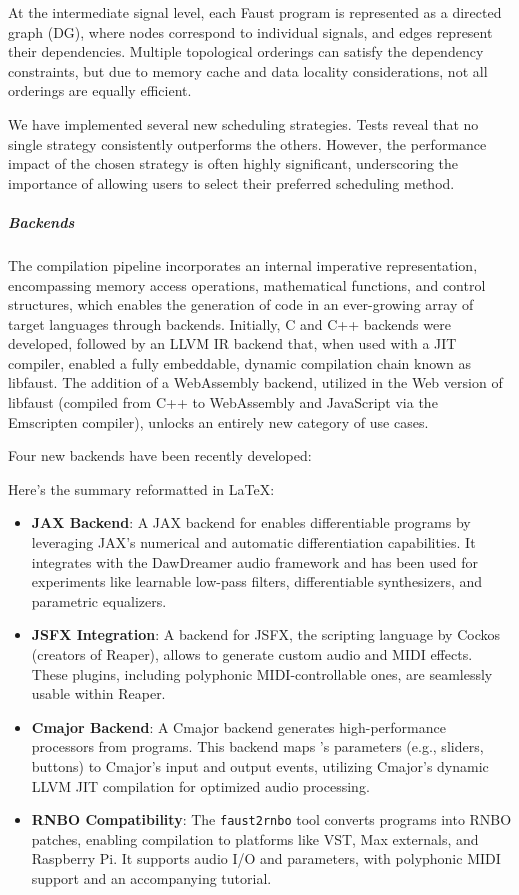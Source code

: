 At the intermediate signal level, each Faust program is represented as a directed graph (DG), where nodes correspond to
individual signals, and edges represent their dependencies. Multiple topological orderings can satisfy the dependency
constraints, but due to memory cache and data locality considerations, not all orderings are equally efficient.

We have implemented several new scheduling strategies. Tests reveal that no single strategy consistently outperforms the
others. However, the performance impact of the chosen strategy is often highly significant, underscoring the importance
of allowing users to select their preferred scheduling method.

\subparagraph{Backends}

The \F{} compilation pipeline incorporates an internal imperative representation, encompassing memory access operations,
mathematical functions, and control structures, which enables the generation of code in an ever-growing array of target
languages through backends. Initially, C and C++ backends were developed, followed by an LLVM IR backend that, when used
with a JIT compiler, enabled a fully embeddable, dynamic compilation chain known as libfaust. The addition of a
WebAssembly backend, utilized in the Web version of libfaust (compiled from C++ to WebAssembly and JavaScript via the
Emscripten compiler), unlocks an entirely new category of use cases.

Four new backends have been recently developed:

Here’s the summary reformatted in LaTeX:


\begin{itemize}
\item
  \textbf{JAX Backend}: A JAX backend for \F{} enables differentiable \F{} programs by leveraging JAX's numerical and
  automatic differentiation capabilities. It integrates with the DawDreamer audio framework and has been used for
  experiments like learnable low-pass filters, differentiable synthesizers, and parametric equalizers.
\item
  \textbf{JSFX Integration}: A backend for JSFX, the scripting language by Cockos (creators of Reaper), allows \F{} to
  generate custom audio and MIDI effects. These plugins, including polyphonic MIDI-controllable ones, are seamlessly
  usable within Reaper.
\item
  \textbf{Cmajor Backend}: A Cmajor backend generates high-performance processors from \F{} programs. This backend maps
  \F{}'s parameters (e.g., sliders, buttons) to Cmajor's input and output events, utilizing Cmajor's dynamic LLVM JIT
  compilation for optimized audio processing.
\item
  \textbf{RNBO Compatibility}: The \texttt{faust2rnbo} tool converts \F{} programs into RNBO patches, enabling
  compilation to platforms like VST, Max externals, and Raspberry Pi. It supports audio I/O and parameters, with
  polyphonic MIDI support and an accompanying tutorial.
\end{itemize}


